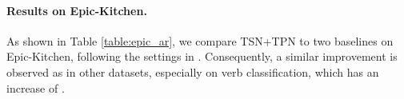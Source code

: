 \documentclass[10pt,twocolumn,letterpaper]{article}
\begin{document}
\paragraph{Results on Epic-Kitchen.}
\begin{table}[t]
    \begin{center}
    \end{center}
    \caption{
    \textbf{Results on the validation set of Epic-Kitchen.}    
    TSN is equipped with TPN.}
    \label{table:epic_ar}
\end{table}

As shown in Table \ref{table:epic_ar}, we compare TSN+TPN to two baselines on Epic-Kitchen, following the settings in \cite{epic}.
Consequently, a similar improvement is observed as in other datasets, especially on verb classification, which has an increase of .
\end{document}
